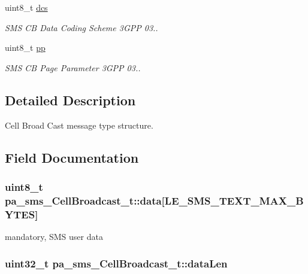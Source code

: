 \begin{DoxyCompactItemize}
uint8\+\_\+t \hyperlink{structpa__sms___cell_broadcast__t_a50cf62e775bf20e9abad6c163118d21e}{dcs}
\begin{DoxyCompactList}\small\item\em S\+MS CB Data Coding Scheme 3\+G\+PP 03.. \end{DoxyCompactList}\item 
uint8\+\_\+t \hyperlink{structpa__sms___cell_broadcast__t_ad7946788c7f6fbd84787c05f91ac11f7}{pp}
\begin{DoxyCompactList}\small\item\em S\+MS CB Page Parameter 3\+G\+PP 03.. \end{DoxyCompactList}\end{DoxyCompactItemize}


\subsection{Detailed Description}
Cell Broad Cast message type structure. 

\subsection{Field Documentation}
\subsubsection[{\texorpdfstring{data}{data}}]{\setlength{\rightskip}{0pt plus 5cm}uint8\+\_\+t pa\+\_\+sms\+\_\+\+Cell\+Broadcast\+\_\+t\+::data\mbox{[}{\bf L\+E\+\_\+\+S\+M\+S\+\_\+\+T\+E\+X\+T\+\_\+\+M\+A\+X\+\_\+\+B\+Y\+T\+ES}\mbox{]}}\hypertarget{structpa__sms___cell_broadcast__t_a70bfdbb646c8a594bc1c29151e67fec9}{}\label{structpa__sms___cell_broadcast__t_a70bfdbb646c8a594bc1c29151e67fec9}


mandatory, S\+MS user data 

\subsubsection[{\texorpdfstring{data\+Len}{dataLen}}]{\setlength{\rightskip}{0pt plus 5cm}uint32\+\_\+t pa\+\_\+sms\+\_\+\+Cell\+Broadcast\+\_\+t\+::data\+Len}\hypertarget{structpa__sms___cell_broadcast__t_a64ea7148f8f9a2ca95497b47e988fe38}{}\label{structpa__sms___cell_broadcast__t_a64ea7148f8f9a2ca95497b47e988fe38}


